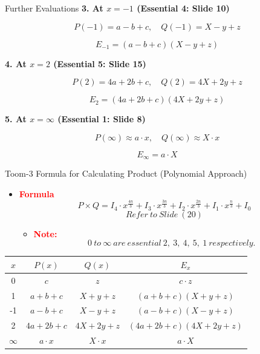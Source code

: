 \documentclass{beamer}
\begin{document}
\begin{frame}{Further Evaluations}
    \textbf{3. At \( x=-1 \) (Essential 4: Slide 10)}
    
    \[
    P(-1) = a - b + c, \quad Q(-1) = X - y + z
    \]

    \[
    E_{-1} = (a - b + c)(X - y + z)
    \]

    \textbf{4. At \( x=2 \) (Essential 5: Slide 15)}
    
    \[
    P(2) = 4a + 2b + c, \quad Q(2) = 4X + 2y + z
    \]

    \[
    E_2 = (4a + 2b + c)(4X + 2y + z)
    \]

    \textbf{5. At \( x=\infty \) (Essential 1: Slide 8)}
    
    \[
    P(\infty) \approx a \cdot x, \quad Q(\infty) \approx X \cdot x
    \]

    \[
    E_{\infty} = a \cdot X
    \]
\end{frame}

\begin{frame}{Toom-3 Formula for Calculating Product (Polynomial Approach)}
 
   \begin{itemize}
       \item \textbf{\textcolor{red}{Formula}} \\
        \[
    P \times Q = I_4 \cdot x^{\frac{4n}{3}} + I_3 \cdot x^{\frac{3n}{3}} + I_2 \cdot x^{\frac{2n}{3}} + I_1 \cdot x^{\frac{n}{3}} + I_0 
    \]
    \[
        Refer \ to \ Slide \ (20)
        \]
    \begin{itemize}
        \item \textbf{\textcolor{red}{Note:}}
        \[
        0 \ to\  \infty \ are \ essential \ 2, \ 3, \ 4, \ 5, \ 1 \ respectively.
        \]
    \end{itemize}
   \end{itemize}
   \centering
    \begin{tabular}{|c|c|c|c|}
        \hline
        $ x $ & $ P(x) $ & $ Q(x) $ & $ E_x $ \\
        \hline
        0 & $ c $ & $ z $ & $ c \cdot z $ \\
        1 & $ a+b+c $ & $ X+y+z $ & $ (a+b+c)(X+y+z) $ \\
        -1 & $ a-b+c $ & $ X-y+z $ & $ (a-b+c)(X-y+z) $ \\
        2 & $ 4a+2b+c $ & $ 4X+2y+z $ & $ (4a+2b+c)(4X+2y+z) $ \\
        $ \infty $ & $ a \cdot x $ & $ X \cdot x $ & $ a \cdot X $ \\
        \hline
    \end{tabular}
\end{frame}
\end{document}
